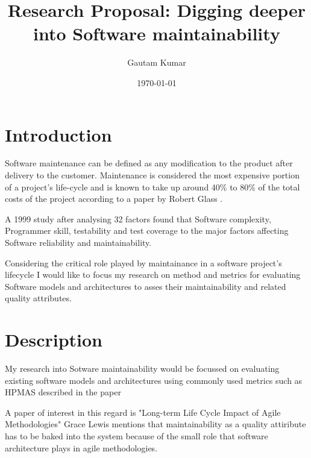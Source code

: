 \documentclass[dvips,12pt]{article}
\begin{document}

\title{Research Proposal: Digging deeper into Software maintainability}
\author{Gautam Kumar}
\date{\today}


\maketitle


\section{Introduction}

Software maintenance can be defined as any modification to the product after delivery to the customer. Maintenance is considered the most expensive portion of a project's life-cycle and is known to take up around 40\% to 80\% of the total costs of the project according to a paper by Robert Glass \cite{glass_frequently_2001}. 

A 1999 study\cite{zhang_analysis_2000} after analysing 32 factors found that Software complexity, Programmer skill, testability and test coverage to the major factors affecting Software reliability and maintainability.

Considering the critical role played by maintainance in a software project's lifecycle I would like to focus my research on method and metrics for evaluating Software models and architectures to asses their maintainability and related quality attributes. 

\section{Description}

My research into Sotware maintainability would be focussed on evaluating existing  software models and architectures using commonly used metrics such as HPMAS described in the paper \cite{coleman_using_1994}

A paper of interest in this regard is "Long-term Life Cycle Impact of Agile Methodologies" \cite{kajko-mattsson_long-term_2006} Grace Lewis mentions that maintainability as a quality attiribute has to be baked into the system because of the small role that software architecture plays in agile methodologies. 
\end{document}
